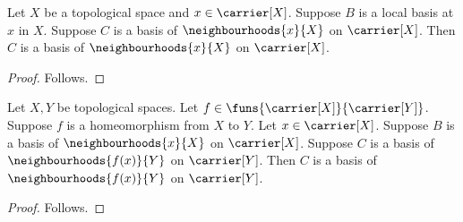 

\begin{proposition}\label{notion_neighbourhood_direct_guard}
    Let $X$ be a topological space and $x\in\carrier[X]$.
    Suppose $B$ is a local basis at $x$ in $X$.
    Suppose $C$ is a basis of $\neighbourhoods{x}{X}$ on $\carrier[X]$.
    Then $C$ is a basis of $\neighbourhoods{x}{X}$ on $\carrier[X]$.
\end{proposition}
\begin{proof}
    Follows.
\end{proof}

\begin{proposition}\label{notion_neighbourhood_application_guard}
    Let $X,Y$ be topological spaces.
    Let $f\in\funs{\carrier[X]}{\carrier[Y]}$.
    Suppose $f$ is a homeomorphism from $X$ to $Y$.
    Let $x\in\carrier[X]$.
    Suppose $B$ is a basis of $\neighbourhoods{x}{X}$ on $\carrier[X]$.
    Suppose $C$ is a basis of $\neighbourhoods{f(x)}{Y}$ on $\carrier[Y]$.
    Then $C$ is a basis of $\neighbourhoods{f(x)}{Y}$ on $\carrier[Y]$.
\end{proposition}
\begin{proof}
    Follows.
\end{proof}
